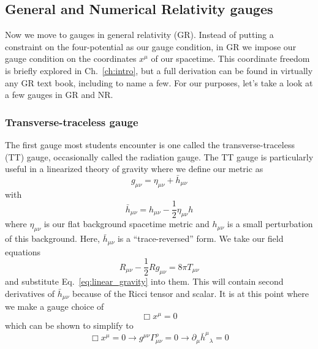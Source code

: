 \begin{bibunit}[unsrtnat]
\subsection{General and Numerical Relativity gauges}

Now we move to gauges in general relativity (GR). Instead of putting a
constraint on the four-potential as our gauge condition, in GR we impose our
gauge condition on the coordinates $x^\mu$ of our spacetime. This coordinate
freedom is briefly explored in Ch.~\ref{ch:intro}, but a full derivation can be
found in virtually any GR text book, including
\cite{Misner:1973prb,Wald:1984rg,Carroll:2004st} to name a few. For our
purposes, let's take a look at a few gauges in GR and NR.

\subsubsection{Transverse-traceless gauge}
The first gauge most students encounter is one called the transverse-traceless
(TT) gauge, occasionally called the radiation gauge. The TT gauge is
particularly useful in a linearized theory of gravity where we define our metric
as
\begin{equation}\label{eq:linear_gravity}
  g_{\mu\nu} = \eta_{\mu\nu} + \bar{h}_{\mu\nu}
\end{equation}
with
\begin{equation}
  \bar{h}_{\mu\nu} = h_{\mu\nu} - \frac{1}{2}\eta_{\mu\nu}h
\end{equation}
where $\eta_{\mu\nu}$ is our flat background spacetime metric and $h_{\mu\nu}$
is a small perturbation of this background. Here, $\bar{h}_{\mu\nu}$ is a
``trace-reversed'' form. We take our field equations
\begin{equation}\label{eq:field_equations}
  R_{\mu\nu} - \frac{1}{2}Rg_{\mu\nu} = 8\pi T_{\mu\nu} 
\end{equation}
and substitute Eq.~\ref{eq:linear_gravity} into them. This will contain second
derivatives of $\bar{h}_{\mu\nu}$ because of the Ricci tensor and scalar. It is at
this point where we make a gauge choice of
\begin{equation}\label{eq:harmonic_gauge}
  \Box x^\mu = 0
\end{equation}
which can be shown to simplify to
\begin{equation}\label{eq:linear_harmonic_gauge}
  \Box x^\mu = 0 \rightarrow g^{\mu\nu}\Gamma^\rho_{\mu\nu} = 0 \rightarrow
  \partial_\mu {\bar{h}^\mu}_{\lambda} = 0
\end{equation}

\end{bibunit}
